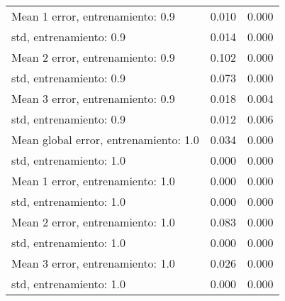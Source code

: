 \begin{longtable}{p{4cm}|p{1.5cm}|p{1.5cm}}
Mean 1 error, entrenamiento: 0.9      &              0.010 &        0.000 \\
std, entrenamiento: 0.9               &              0.014 &        0.000 \\
Mean 2 error, entrenamiento: 0.9      &              0.102 &        0.000 \\
std, entrenamiento: 0.9               &              0.073 &        0.000 \\
Mean 3 error, entrenamiento: 0.9      &              0.018 &        0.004 \\
std, entrenamiento: 0.9               &              0.012 &        0.006 \\
Mean global error, entrenamiento: 1.0 &              0.034 &        0.000 \\
std, entrenamiento: 1.0               &              0.000 &        0.000 \\
Mean 1 error, entrenamiento: 1.0      &              0.000 &        0.000 \\
std, entrenamiento: 1.0               &              0.000 &        0.000 \\
Mean 2 error, entrenamiento: 1.0      &              0.083 &        0.000 \\
std, entrenamiento: 1.0               &              0.000 &        0.000 \\
Mean 3 error, entrenamiento: 1.0      &              0.026 &        0.000 \\
std, entrenamiento: 1.0               &              0.000 &        0.000 \\
\end{longtable}
